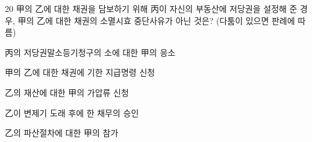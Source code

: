 \begin{question}{20}
甲의 乙에 대한 채권을 담보하기 위해 丙이 자신의 부동산에 저당권을 설정해 준 경우, 甲의 乙에 대한 채권의 소멸시효 중단사유가 아닌 것은? (다툼이 있으면 판례에 따름)
\begin{choices}
  \item 丙의 저당권말소등기청구의 소에 대한 甲의 응소
  \item 甲의 乙에 대한 채권에 기한 지급명령 신청
  \item 乙의 재산에 대한 甲의 가압류 신청
  \item 乙이 변제기 도래 후에 한 채무의 승인
  \item 乙의 파산절차에 대한 甲의 참가
\end{choices}
\end{question}
